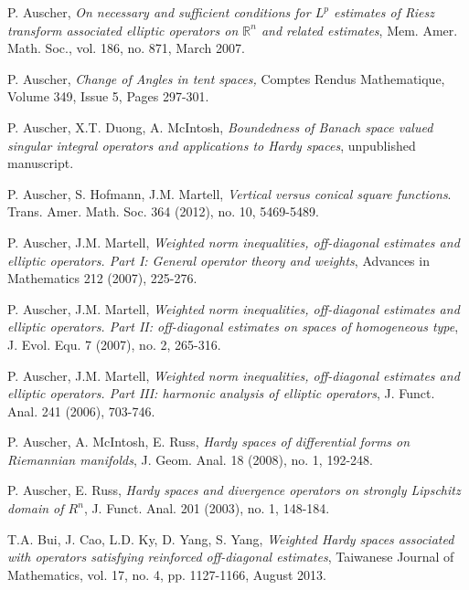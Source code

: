 \documentclass[11pt, a4paper,leqno]{amsart}
\theoremstyle{plain}
\theoremstyle{definition}
\theoremstyle{remark}
\numberwithin{equation}{section}
\begin{document}
\begin{thebibliography}{10}



P. Auscher, {\em On necessary and sufficient conditions for $L^p$
estimates of Riesz transform associated elliptic operators on
$\mathbb{R}^n$ and related estimates}, Mem. Amer. Math. Soc., vol. 186, no.
871, March 2007.

P. Auscher, {\em Change of Angles in tent spaces,}  Comptes Rendus Mathematique, Volume 349, Issue 5, Pages 297-301.


  P. Auscher, X.T. Duong, A. McIntosh, {\em Boundedness of Banach space valued
singular integral operators and applications to Hardy spaces}, unpublished
manuscript. 




P. Auscher, S. Hofmann, J.M. Martell, {\em Vertical versus conical square functions}. Trans. Amer. Math. Soc.
 364 (2012), no. 10, 5469-5489. 


P. Auscher, J.M. Martell, {\em Weighted norm inequalities,
off-diagonal estimates and elliptic operators. Part I: General operator theory and weights}, Advances in Mathematics 212 (2007), 225-276.

P. Auscher, J.M. Martell, {\em Weighted norm inequalities,
off-diagonal estimates and elliptic operators. Part II: off-diagonal
estimates on spaces of homogeneous type}, J. Evol. Equ. 7 (2007),
no. 2, 265-316.


P. Auscher, J.M. Martell,
{\em Weighted norm inequalities, off-diagonal estimates
and elliptic operators.
Part III: harmonic analysis of elliptic operators}, J. Funct. Anal. 241 (2006), 703-746.



  P. Auscher, A. McIntosh, E. Russ, {\em Hardy spaces of differential forms on
Riemannian manifolds}, J. Geom. Anal. 18 (2008), no. 1, 192-248.


 P. Auscher, E. Russ, {\em Hardy spaces and divergence operators on strongly Lipschitz domain of $R^n$}, J. Funct. Anal. 201 (2003), no. 1, 148-184.


T.A. Bui, J. Cao, L.D. Ky, D. Yang, S. Yang, {\em Weighted Hardy spaces associated with operators satisfying reinforced off-diagonal estimates}, Taiwanese Journal of Mathematics,
vol. 17, no. 4, pp. 1127-1166, August 2013.


\end{thebibliography}
\end{document}
